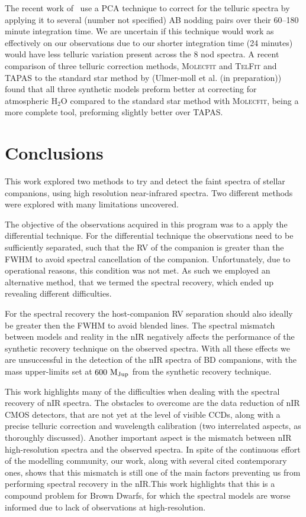 \documentclass[fleqn,usenatbib]{mnras}
\begin{document}
{ The recent work of~\citet{piskorz_evidence_2016} use a PCA technique to correct for the telluric spectra by applying it to several (number not specified) AB nodding pairs over their 60--180 minute integration time. We are uncertain if this technique would work as effectively on our observations due to our shorter integration time (24 minutes) would have less telluric variation present across the 8 nod spectra. A recent comparison of three telluric correction methods, \textsc{Molecfit} and \textsc{TelFit} and {TAPAS} to the standard star method by (Ulmer-moll et al. (in preparation)) %
 found that all three synthetic models preform better at correcting for atmospheric H$_2$O compared to the standard star method with \textsc{Molecfit}, being a more complete tool, preforming slightly better over TAPAS.}


\section{Conclusions}
\label{sec:conclusions}
This work explored two methods to try and detect the faint spectra of stellar companions, using high resolution near-infrared spectra. Two different methods were explored with many limitations uncovered.

The objective of the observations acquired in this program was to a apply the differential technique. For the differential technique the observations need to be sufficiently separated, such that the RV of the companion is greater than the FWHM to avoid spectral cancellation of the companion. Unfortunately, due to operational reasons, this condition was not met. As such we employed an alternative method, that we termed the spectral recovery, which ended up revealing different difficulties.

For the spectral recovery the host-companion RV separation should also ideally be greater then the FWHM to avoid blended lines. The spectral mismatch between models and reality in the nIR negatively affects the performance of the synthetic recovery technique on the observed spectra. With all these effects we are unsuccessful in the detection of the nIR spectra of BD companions,  with the mass upper-limits set at \(\rm 600~M_{Jup}\) from the synthetic recovery technique.

This work highlights many of the difficulties when dealing with the spectral recovery of nIR spectra. The obstacles to overcome are the data reduction of nIR CMOS detectors, that are not yet at the level of visible CCDs, along with a precise telluric correction and wavelength calibration (two interrelated aspects, as thoroughly discussed). Another important aspect is the mismatch between nIR high-resolution spectra and the observed spectra. In spite of the continuous effort of the modelling community, our work, along with several cited contemporary ones, shows that this mismatch is still one of the main factors preventing us from performing spectral recovery in the nIR.\@ This work highlights that this is a compound problem for Brown Dwarfs, for which the spectral models are worse informed due to lack of observations at high-resolution.
\end{document}
